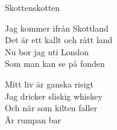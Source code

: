 \begin{song}{Skotten}{skotten}
\begin{vers}
Jag kommer ifrån Skottland\\
Det är ett kallt och rått land\\
Nu bor jag uti London\\
Som man kan se på fonden\\
\end{vers}
\begin{vers}
Mitt liv är ganska risigt\\
Jag dricker sliskig whiskey\\
Och när som kilten faller\\
Är rumpan bar\\
\end{vers}
\end{song}
